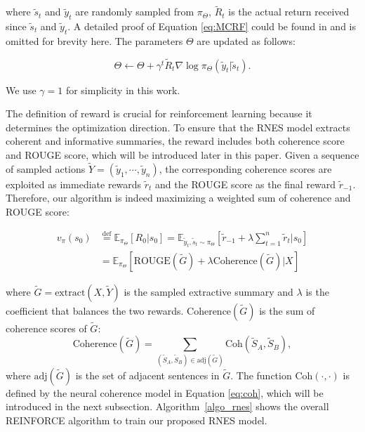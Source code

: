 	where $\tilde{s}_t$ and $\tilde{y}_t$ are randomly sampled from $\pi_{\Theta}$, $\tilde{R}_t$ is the actual return received since $\tilde{s}_t$ and $\tilde{y}_t$. A detailed proof of Equation \ref{eq:MCRF} could be found in \cite{sutton_reinforcement_nodate} and is omitted for brevity here. The parameters $\Theta$ are updated as follows:

\begin{equation} \label{eq:update}
	\Theta \leftarrow \Theta + \gamma^t \tilde{R}_t \nabla \log \pi_{\Theta}(\tilde{y}_t|\tilde{s}_t) .
	\end{equation}

	We use $\gamma=1$ for simplicity in this work.

	The definition of reward is crucial for reinforcement learning because it determines the optimization direction. To ensure that the RNES model extracts coherent and informative summaries, the reward includes both coherence score and ROUGE score, which will be introduced later in this paper. Given a sequence of sampled actions $\tilde{Y} = (\tilde{y}_1, \cdots, \tilde{y}_n)$, the corresponding coherence scores are exploited as immediate rewards $\tilde{r}_t$ and the ROUGE score as the final reward $\tilde{r}_{-1}$. Therefore, our algorithm is indeed maximizing a weighted sum of coherence and ROUGE score:

\begin{align}
	v_{\pi}(s_0) &\overset{\text{def}}{=} \mathbb{E}_{\pi_{\Theta}}[R_0 |s_0] = \mathbb{E}_{\tilde{y}_t, \tilde{s}_t \sim \pi_{\Theta}} [ \tilde{r}_{-1} + \lambda \sum_{t=1}^{n} \tilde{r}_t | s_0] \nonumber \\
	&= \mathbb{E}_{\pi_{\Theta}} [ \text{ROUGE}(\tilde{G}) + \lambda \text{Coherence}(\tilde{G}) | X ] \label{eq:reward_sum} 
	\end{align}

	where $\tilde{G} =\text{extract} (X, \tilde{Y})$ is the sampled extractive summary and $\lambda$ is the coefficient that balances the two rewards. $\text{Coherence}(\tilde{G})$ is the sum of coherence scores of $\tilde{G}$:
	\[\text{Coherence}(\tilde{G})= \sum_{(\tilde{S}_A, \tilde{S}_B) \in \text{adj}(\tilde{G})} \text{Coh}(\tilde{S}_A, \tilde{S}_B) ,\]
 	where $\text{adj}(\tilde{G})$ is the set of adjacent sentences in $\tilde{G}$. The function $\text{Coh}(\cdot,\cdot)$ is defined by the neural coherence model in Equation \ref{eq:coh}, which will be introduced in the next subsection. Algorithm~\ref{algo_rnes} shows the overall REINFORCE algorithm to train our proposed RNES model.

